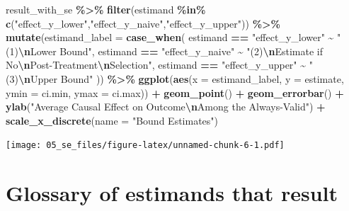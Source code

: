 \documentclass[
]{book}
\newenvironment{Shaded}{\begin{snugshade}}{\end{snugshade}}
\newcommand{\AttributeTok}[1]{\textcolor[rgb]{0.13,0.29,0.53}{#1}}
\newcommand{\FunctionTok}[1]{\textcolor[rgb]{0.13,0.29,0.53}{\textbf{#1}}}
\newcommand{\NormalTok}[1]{#1}
\newcommand{\SpecialCharTok}[1]{\textcolor[rgb]{0.81,0.36,0.00}{\textbf{#1}}}
\newcommand{\StringTok}[1]{\textcolor[rgb]{0.31,0.60,0.02}{#1}}
\begin{document}
\begin{Shaded}
\begin{Highlighting}[]
\NormalTok{result\_with\_se }\SpecialCharTok{\%\textgreater{}\%}
  \FunctionTok{filter}\NormalTok{(estimand }\SpecialCharTok{\%in\%} \FunctionTok{c}\NormalTok{(}\StringTok{"effect\_y\_lower"}\NormalTok{,}\StringTok{"effect\_y\_naive"}\NormalTok{,}\StringTok{"effect\_y\_upper"}\NormalTok{)) }\SpecialCharTok{\%\textgreater{}\%}
  \FunctionTok{mutate}\NormalTok{(}\AttributeTok{estimand\_label =} \FunctionTok{case\_when}\NormalTok{(}
\NormalTok{    estimand }\SpecialCharTok{==} \StringTok{"effect\_y\_lower"} \SpecialCharTok{\textasciitilde{}} \StringTok{"(1)}\SpecialCharTok{\textbackslash{}n}\StringTok{Lower Bound"}\NormalTok{,}
\NormalTok{    estimand }\SpecialCharTok{==} \StringTok{"effect\_y\_naive"} \SpecialCharTok{\textasciitilde{}} \StringTok{"(2)}\SpecialCharTok{\textbackslash{}n}\StringTok{Estimate if No}\SpecialCharTok{\textbackslash{}n}\StringTok{Post{-}Treatment}\SpecialCharTok{\textbackslash{}n}\StringTok{Selection"}\NormalTok{,}
\NormalTok{    estimand }\SpecialCharTok{==} \StringTok{"effect\_y\_upper"} \SpecialCharTok{\textasciitilde{}} \StringTok{"(3)}\SpecialCharTok{\textbackslash{}n}\StringTok{Upper Bound"}
\NormalTok{  )) }\SpecialCharTok{\%\textgreater{}\%}
  \FunctionTok{ggplot}\NormalTok{(}\FunctionTok{aes}\NormalTok{(}\AttributeTok{x =}\NormalTok{ estimand\_label, }\AttributeTok{y =}\NormalTok{ estimate,}
             \AttributeTok{ymin =}\NormalTok{ ci.min, }\AttributeTok{ymax =}\NormalTok{ ci.max)) }\SpecialCharTok{+}
  \FunctionTok{geom\_point}\NormalTok{() }\SpecialCharTok{+}
  \FunctionTok{geom\_errorbar}\NormalTok{() }\SpecialCharTok{+}
  \FunctionTok{ylab}\NormalTok{(}\StringTok{"Average Causal Effect on Outcome}\SpecialCharTok{\textbackslash{}n}\StringTok{Among the Always{-}Valid"}\NormalTok{) }\SpecialCharTok{+}
  \FunctionTok{scale\_x\_discrete}\NormalTok{(}\AttributeTok{name =} \StringTok{"Bound Estimates"}\NormalTok{)}
\end{Highlighting}
\end{Shaded}

\texttt{[image: 05\_se\_files/figure-latex/unnamed-chunk-6-1.pdf]}

\hypertarget{glossary-of-estimands-that-result}{%
\section{Glossary of estimands that result}\label{glossary-of-estimands-that-result}}
\end{document}

